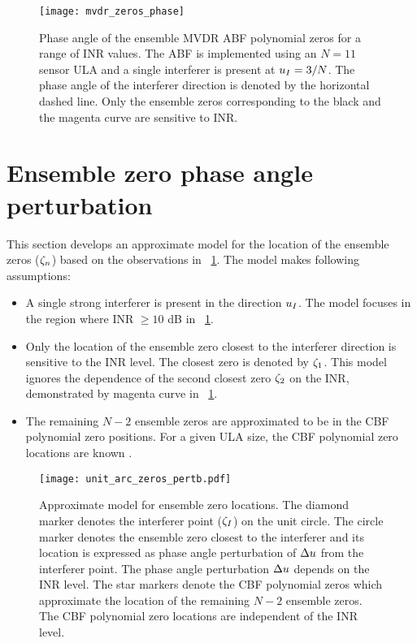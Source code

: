 
\begin{figure}[!hp]
  \centering
  \texttt{[image: mvdr\_zeros\_phase]}
  \caption[Phase angle of the ensemble MVDR ABF polynomial
  zeros]{Phase angle of the ensemble MVDR ABF polynomial zeros for a
    range of INR values. The ABF is implemented using an $N = 11$
    sensor ULA and a single interferer is present at $u_I = 3/N$.
    The phase angle of the interferer direction is denoted by the
    horizontal dashed line. Only the ensemble zeros corresponding to
    the black and the magenta curve are sensitive to INR.}
  \label{fig:mvdr-zeros-phase}
\end{figure}

\section{Ensemble zero phase angle perturbation}
\label{sec:perturbation-model}
This section develops an approximate model for the location of the
ensemble zeros ($\zeta_n$) based on the observations in
\figurename{}~\ref{fig:mvdr-zeros-phase}. The model makes following
assumptions:
\begin{itemize}
\item A single strong interferer is present in the direction
  $u_I$. The model focuses in the region where INR $\geq 10$ dB in \figurename{}~\ref{fig:mvdr-zeros-phase}.
\item Only the location of the ensemble zero closest to the interferer
  direction is sensitive to the INR level. The closest zero is denoted
  by $\zeta_1$. This model ignores the dependence of the second
  closest zero $\zeta_2$ on the INR, demonstrated by magenta curve in
  \figurename{}~\ref{fig:mvdr-zeros-phase}.
\item The remaining $N - 2$ ensemble zeros are approximated to be in
  the CBF polynomial zero positions. For a given ULA size, the CBF
  polynomial zero locations are known \cite{vtree2002oap}.
\end{itemize}

\begin{figure}[!hp]
  \centering
  \texttt{[image: unit\_arc\_zeros\_pertb.pdf]}
  \caption[Approximate model for ensemble zero locations]{Approximate model for
    ensemble zero locations. The diamond marker denotes the interferer
    point ($\zeta_I$) on the unit circle. The circle marker denotes
    the ensemble zero closest to the interferer and its location is
    expressed as phase angle perturbation of $\Delta u$ from the
    interferer point. The phase angle perturbation $\Delta u$ depends
    on the INR level. The star markers denote the CBF polynomial zeros
    which approximate the location of the remaining $N - 2$ ensemble
    zeros. The CBF polynomial zero locations are independent of the
    INR level.}
  \label{fig:perturb-model}
\end{figure}

